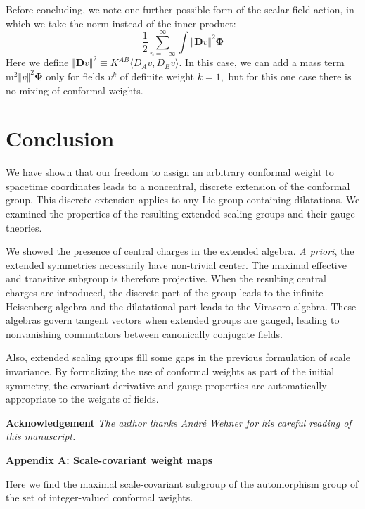 \documentclass[a4paper,12pt]{article}
\begin{document}
Before concluding, we note one further possible form of the scalar field
action, in which we take the norm instead of the inner product: 
\begin{equation}
\frac{1}{2}\sum_{n=-\infty }^{\infty }\int \Vert \mathbf{D}v\Vert ^{2}%
\mathbf{\Phi }
\end{equation}
Here we define $\Vert \mathbf{D}v\Vert ^{2}\equiv K^{AB}\langle D_{A}\bar{v}
,D_{B}v\rangle .$ In this case, we can add a mass term $\mathrm{m}^{2}\Vert
v\Vert ^{2}\mathbf{\Phi }$ only for fields $v^{k}$ of definite weight $k=1,$
but for this one case there is no mixing of conformal weights.

\section{Conclusion}

We have shown that our freedom to assign an arbitrary conformal weight to
spacetime coordinates leads to a noncentral, discrete extension of the
conformal group. This discrete extension applies to any Lie group
containing dilatations. We examined the properties of the resulting extended
scaling groups and their gauge theories.

We showed the presence of central charges in the extended algebra. \textit{A
priori}, the extended symmetries necessarily have non-trivial center. The
maximal effective and transitive subgroup is therefore projective. When the
resulting central charges are introduced, the discrete part of the group
leads to the infinite Heisenberg algebra and the dilatational part leads to
the Virasoro algebra. These algebras govern tangent vectors when extended
groups are gauged, leading to nonvanishing commutators between canonically
conjugate fields.

Also, extended scaling groups fill some gaps in the previous formulation of
scale invariance. By formalizing the use of conformal weights as part of the
initial symmetry, the covariant derivative and gauge properties are
automatically appropriate to the weights of fields.

\bigskip

\noindent \textbf{Acknowledgement} \textit{The author thanks Andr\'{e} Wehner for his careful reading of this manuscript.}

\bigskip

\noindent \textbf{Appendix A: Scale-covariant weight maps}

\medskip
Here we find the maximal scale-covariant subgroup of the automorphism group of the set of integer-valued conformal weights.
\end{document}
